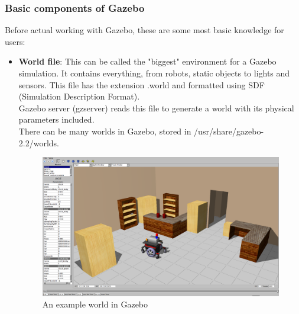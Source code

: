 \documentclass[pdftex,12pt,a4paper]{article}
\begin{document}
  \subsubsection{Basic components of Gazebo}
  Before actual working with Gazebo, these are some most basic knowledge for users:
  \begin{itemize}
  \item \textbf{World file}: This can be called the "biggest" environment for a Gazebo simulation. It contains everything, from robots, static objects to lights and sensors. This file has the extension .world and formatted using SDF (Simulation Description Format).\\
  Gazebo server (gzserver) reads this file to generate a world  with its physical parameters included.\\
  There can be many worlds in Gazebo, stored in /usr/share/gazebo-2.2/worlds.
  \begin{figure}[h]
      \centering
      \includegraphics[width=1\linewidth]{image/gazebo_world.png}
      \caption{An example world in Gazebo}
      \label{fig:gazebo_world}
  \end{figure}
  

\end{itemize}
\end{document}
